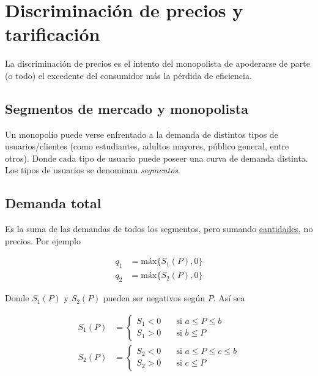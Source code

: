 \section{Discriminación de precios y tarificación}
La discriminación de precios es el intento del monopolista de apoderarse de parte (o todo) el excedente del consumidor más la pérdida de eficiencia.


\subsection{Segmentos de mercado y monopolista}

Un monopolio puede verse enfrentado a la demanda de distintos tipos de usuarios/clientes (como estudiantes, adultos mayores, público general, entre otros). Donde cada tipo de usuario puede poseer una curva de demanda distinta.\\

Los tipos de usuarios se denominan \textit{segmentos}.

\subsection{Demanda total}

Es la suma de las demandas de todos los segmentos, pero sumando \underline{cantidades}, no precios. Por ejemplo

\begin{equation}
	\begin{split}
		q_1 &= \text{máx}\{ S_1(P), 0 \}\\
		q_2 &= \text{máx}\{ S_2(P), 0 \}
	\end{split}
	\nonumber
\end{equation}

Donde $S_1(P)$ y $S_2(P)$ pueden ser negativos según $P$. Así sea

\begin{equation}
	\begin{split}
		S_1(P) &= \begin{cases} 
					S_1 < 0 &\quad \text{si } a \leq P \leq b\\ 
					S_1 > 0 &\quad \text{si } b \leq P
					\end{cases}\\
		S_2(P) &= \begin{cases} 
					S_2 < 0 &\quad \text{si } a \leq P \leq c \leq b\\ 
					S_2 > 0 &\quad \text{si } c \leq P
					\end{cases}
	\end{split}
	\nonumber	
\end{equation}

